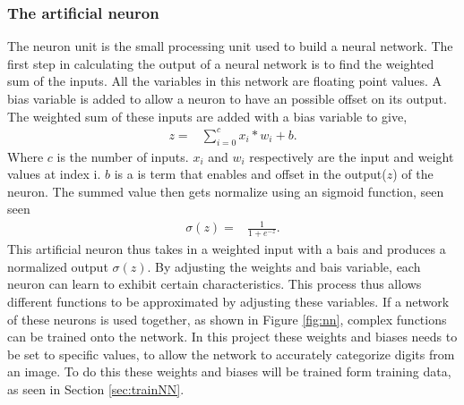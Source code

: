 \subsubsection{The artificial neuron}
The neuron unit is the small processing unit used to build a neural network. The first step in calculating the output of a neural network is to find the weighted sum of the inputs. All the variables in this network are floating point values. A bias variable is added to allow a neuron to have an possible offset on its output. The weighted sum of these inputs are added with a bias variable to give,
\begin{align}
  z =  &\displaystyle{\sum_{i=0}^{c} x_{i}*w_{i} + b}.
\label{eqn:nnOut}
\end{align}
Where $c$ is the number of inputs. $x_{i}$ and $w_{i}$ respectively are the input and weight values at index i. $b$ is a is term that enables and offset in the output($z$) of the neuron.
The summed value then gets normalize using an sigmoid function, seen seen
\begin{align}
  \sigma(z) =  &\displaystyle{\frac{1}{1 + e^{-z}}}.
\label{eqn:sigmoid}
\end{align}
This artificial neuron thus takes in a weighted input with a bais and produces a normalized output $\sigma(z)$. By adjusting the weights and bais variable, each neuron can learn to exhibit certain characteristics. This process thus allows different functions to be approximated by adjusting these variables. If a network of these neurons is used together, as shown in Figure \ref{fig:nn}, complex functions can be trained onto the network. In this project these weights and biases needs to be set to specific values, to allow the network to accurately categorize digits from an image. To do this these weights and biases will be trained form training data, as seen in Section \ref{sec:trainNN}.

